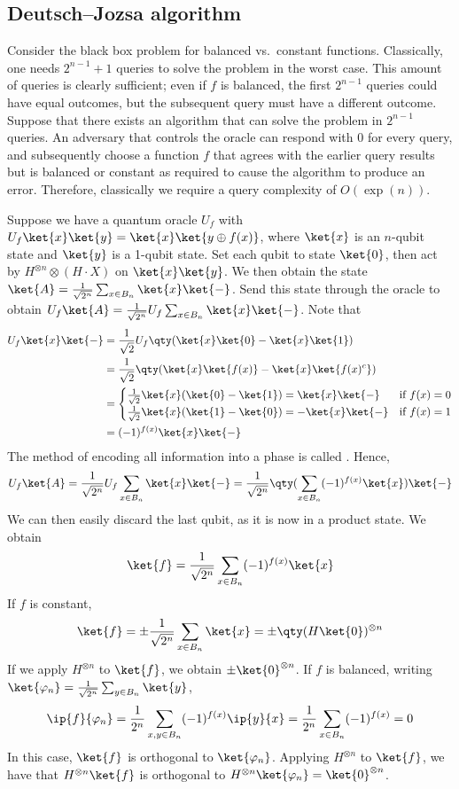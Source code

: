 \subsection{Deutsch--Jozsa algorithm}
Consider the black box problem for balanced vs.\ constant functions.
Classically, one needs $2^{n-1} + 1$ queries to solve the problem in the worst case.
This amount of queries is clearly sufficient; even if $f$ is balanced, the first $2^{n-1}$ queries could have equal outcomes, but the subsequent query must have a different outcome.
Suppose that there exists an algorithm that can solve the problem in $2^{n-1}$ queries.
An adversary that controls the oracle can respond with 0 for every query, and subsequently choose a function $f$ that agrees with the earlier query results but is balanced or constant as required to cause the algorithm to produce an error.
Therefore, classically we require a query complexity of $O(\exp(n))$.

Suppose we have a quantum oracle $U_f$ with $U_f \ket{x} \ket{y} = \ket{x} \ket{y \oplus f(x)}$, where $\ket{x}$ is an $n$-qubit state and $\ket{y}$ is a 1-qubit state.
Set each qubit to state $\ket{0}$, then act by $H^{\otimes n} \otimes (H \cdot X)$ on $\ket{x} \ket{y}$.
We then obtain the state $\ket{A} = \frac{1}{\sqrt{2^n}} \sum_{x \in B_n} \ket{x} \ket{-}$.
Send this state through the oracle to obtain $U_f \ket{A} = \frac{1}{\sqrt{2^n}} U_f \sum_{x \in B_n} \ket{x} \ket{-}$.
Note that
\begin{align*}
    U_f \ket{x} \ket{-} &= \frac{1}{\sqrt{2}} U_f \qty(\ket{x}\ket{0} - \ket{x}\ket{1}) \\
    &= \frac{1}{\sqrt{2}} \qty(\ket{x}\ket{f(x)} - \ket{x}\ket{f(x)^c}) \\
    &= \begin{cases}
        \frac{1}{\sqrt{2}}\ket{x}(\ket{0} - \ket{1}) = \ket{x}\ket{-} & \text{if } f(x) = 0 \\
        \frac{1}{\sqrt{2}}\ket{x}(\ket{1} - \ket{0}) = -\ket{x}\ket{-} & \text{if } f(x) = 1
    \end{cases} \\
    &= (-1)^{f(x)} \ket{x}\ket{-}
\end{align*}
The method of encoding all information into a phase is called .
Hence,
\[ U_f \ket{A} = \frac{1}{\sqrt{2^n}} U_f \sum_{x \in B_n} \ket{x} \ket{-} = \frac{1}{\sqrt{2^n}} \qty(\sum_{x \in B_n} (-1)^{f(x)} \ket{x}) \ket{-} \]
We can then easily discard the last qubit, as it is now in a product state.
We obtain
\[ \ket{f} = \frac{1}{\sqrt{2^n}} \sum_{x \in B_n} (-1)^{f(x)} \ket{x} \]
If $f$ is constant,
\[ \ket{f} = \pm \frac{1}{\sqrt{2^n}} \sum_{x \in B_n} \ket{x} = \pm \qty(H \ket{0})^{\otimes n} \]
If we apply $H^{\otimes n}$ to $\ket{f}$, we obtain $\pm \ket{0}^{\otimes n}$.
If $f$ is balanced, writing $\ket{\varphi_n} = \frac{1}{\sqrt{2^n}} \sum_{y \in B_n} \ket{y}$,
\[ \ip{f}{\varphi_n} = \frac{1}{2^n} \sum_{x, y \in B_n} (-1)^{f(x)} \ip{y}{x} = \frac{1}{2^n} \sum_{x \in B_n} (-1)^{f(x)} = 0 \]
In this case, $\ket{f}$ is orthogonal to $\ket{\varphi_n}$.
Applying $H^{\otimes n}$ to $\ket{f}$, we have that $H^{\otimes n} \ket{f}$ is orthogonal to $H^{\otimes n} \ket{\varphi_n} = \ket{0}^{\otimes n}$.

